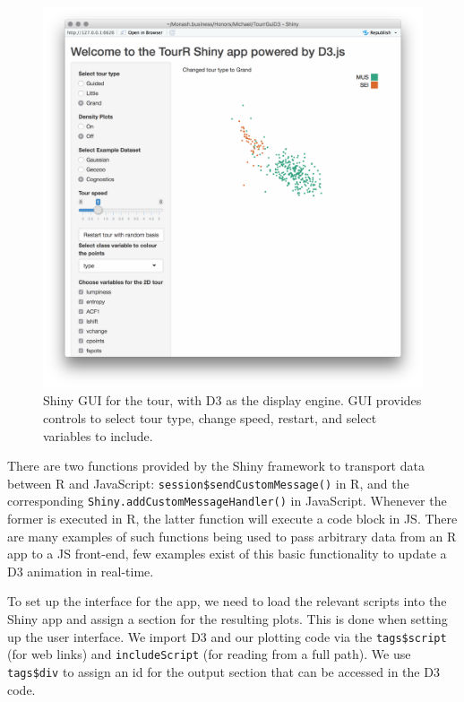 \begin{figure}[ht]
\centerline{\includegraphics[width=15cm]{figures/TourrD3.png}}
\caption{Shiny GUI for the tour, with D3 as the display engine. GUI provides controls to select tour type, change speed, restart, and select variables to include.}
\label{tourrD3}
\end{figure}

There are two functions provided by the Shiny framework to transport
data between R and JavaScript: \texttt{session\$sendCustomMessage()} in
R, and the corresponding \texttt{Shiny.addCustomMessageHandler()} in
JavaScript. Whenever the former is executed in R, the latter function
will execute a code block in JS. There are many examples of such
functions being used to pass arbitrary data from an R app to a JS
front-end, few examples exist of this basic functionality to update a D3
animation in real-time.

To set up the interface for the app, we need to load the relevant
scripts into the Shiny app and assign a section for the resulting plots.
This is done when setting up the user interface. We import D3 and our
plotting code via the \texttt{tags\$script} (for web links) and
\texttt{includeScript} (for reading from a full path). We use
\texttt{tags\$div} to assign an id for the output section that can be
accessed in the D3 code.

